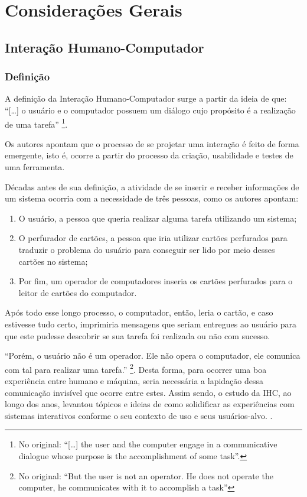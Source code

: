 \chapter{Considerações Gerais}
\label{cap:02}

\section{Interação Humano-Computador}

\subsection{Definição}

A definição da Interação Humano-Computador surge a partir da ideia de que: ``[\dots] o usuário e o computador possuem um diálogo cujo propósito é a realização de uma tarefa'' \cite[p. 4, tradução nossa]{Card1983}\footnote{No original: ``[\dots] the user and the computer engage in a communicative dialogue whose purpose is the accomplishment of some task''.}.

Os autores apontam que o processo de se projetar uma interação é feito de forma emergente, isto é, ocorre a partir do processo da criação, usabilidade e testes de uma ferramenta.

Décadas antes de sua definição, a atividade de se inserir e receber informações de um sistema ocorria com a necessidade de três pessoas, como os autores apontam:
\begin{enumerate}
    \item O usuário, a pessoa que queria realizar alguma tarefa utilizando um sistema;
    \item O perfurador de cartões, a pessoa que iria utilizar cartões perfurados para traduzir o problema do usuário para conseguir ser lido por meio desses cartões no sistema;
    \item Por fim, um operador de computadores inseria os cartões perfurados para o leitor de cartões do computador.
\end{enumerate}
Após todo esse longo processo, o computador, então, leria o cartão, e caso estivesse tudo certo, imprimiria mensagens que seriam entregues ao usuário para que este pudesse descobrir se sua tarefa foi realizada ou não com sucesso.

``Porém, o usuário não é um operador. Ele não opera o computador, ele comunica com tal para realizar uma tarefa.'' \cite[p. 7, tradução nossa]{Card1983}\footnote{No original: ``But the user is not an operator. He does not operate
the computer, he communicates with it to accomplish a task''}. Desta forma, para ocorrer uma boa experiência entre humano e máquina, seria necessária a lapidação dessa comunicação invisível que ocorre entre estes. Assim sendo, o estudo da IHC, ao longo dos anos, levantou tópicos e ideias de como solidificar as experiências com sistemas interativos conforme o seu contexto de uso e seus usuários-alvo. .

